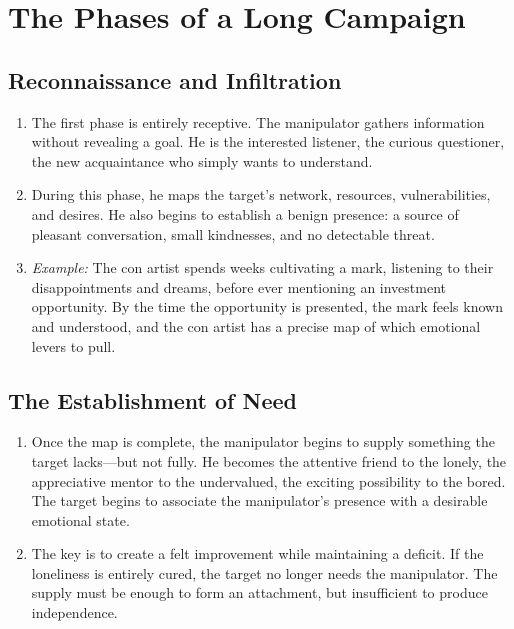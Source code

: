 \documentclass[12pt,a4paper,oneside]{book}
\begin{document}
\chapter{The Phases of a Long Campaign}
\section{Reconnaissance and Infiltration}
\begin{enumerate}[leftmargin=*, label=\arabic*.]
\item The first phase is entirely receptive. The manipulator gathers information without revealing a goal. He is the interested listener, the curious questioner, the new acquaintance who simply wants to understand.
\item During this phase, he maps the target's network, resources, vulnerabilities, and desires. He also begins to establish a benign presence: a source of pleasant conversation, small kindnesses, and no detectable threat.
\item \textit{Example:} The con artist spends weeks cultivating a mark, listening to their disappointments and dreams, before ever mentioning an investment opportunity. By the time the opportunity is presented, the mark feels known and understood, and the con artist has a precise map of which emotional levers to pull.
\end{enumerate}

\section{The Establishment of Need}
\begin{enumerate}[leftmargin=*, label=\arabic*.]
\item Once the map is complete, the manipulator begins to supply something the target lacks—but not fully. He becomes the attentive friend to the lonely, the appreciative mentor to the undervalued, the exciting possibility to the bored. The target begins to associate the manipulator's presence with a desirable emotional state.
\item The key is to create a felt improvement while maintaining a deficit. If the loneliness is entirely cured, the target no longer needs the manipulator. The supply must be enough to form an attachment, but insufficient to produce independence.
\end{enumerate}
\end{document}
